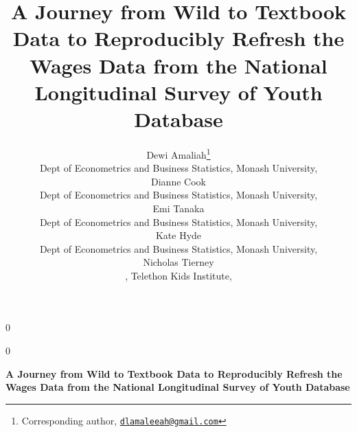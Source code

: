 \documentclass[12pt]{article}
\newcommand{\blind}{0}
\def\spacingset#1{\renewcommand{\baselinestretch}%
{#1}\small\normalsize} \spacingset{1}
\begin{document}
%

\def\spacingset#1{\renewcommand{\baselinestretch}%
{#1}\small\normalsize} \spacingset{1}



\blind
{
  \title{\bf A Journey from Wild to Textbook Data to Reproducibly Refresh the Wages Data from the National Longitudinal Survey of Youth Database}
  \author{
            Dewi Amaliah\thanks{Corresponding author, \href{mailto:dlamaleeah@gmail.com}{\nolinkurl{dlamaleeah@gmail.com}}}\\
      Dept of Econometrics and Business Statistics, Monash University, \\
            Dianne Cook\\
      Dept of Econometrics and Business Statistics, Monash University, \\
            Emi Tanaka\\
      Dept of Econometrics and Business Statistics, Monash University, \\
            Kate Hyde\\
      Dept of Econometrics and Business Statistics, Monash University, \\
            Nicholas Tierney\\
      , Telethon Kids Institute, }
        \maketitle
} \fi

\blind
{
  \bigskip
  \bigskip
  \bigskip
  \begin{center}
    {\LARGE\bf A Journey from Wild to Textbook Data to Reproducibly Refresh the Wages Data from the National Longitudinal Survey of Youth Database}
\end{center}
  \medskip
} \fi
\end{document}

